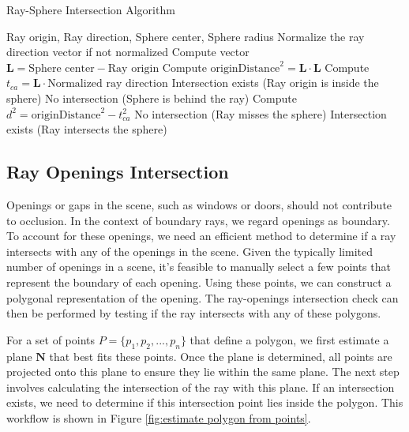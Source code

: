 \documentclass[11pt, a4paper,oneside,chapterprefix=false]{scrbook}
\begin{document}
\begin{algorithm}[H]
\caption{Ray-Sphere Intersection Algorithm}
\begin{algorithmic}[1]
\Require Ray origin, Ray direction, Sphere center, Sphere radius
\State Normalize the ray direction vector if not normalized
\State Compute vector \( \mathbf{L} = \text{Sphere center} - \text{Ray origin} \)
\State Compute \( \text{originDistance}^2 = \mathbf{L} \cdot \mathbf{L} \)
\State Compute \( t_{ca} = \mathbf{L} \cdot \text{Normalized ray direction} \)
    \State \Return Intersection exists (Ray origin is inside the sphere)
\EndIf
{}
    \State \Return No intersection (Sphere is behind the ray)
\EndIf
\State Compute \( d^2 = \text{originDistance}^2 - t_{ca}^2 \)
    \State \Return No intersection (Ray misses the sphere)
\Else
    \State \Return Intersection exists (Ray intersects the sphere)
\EndIf
\end{algorithmic}
\end{algorithm}


\subsection{Ray Openings Intersection}

Openings or gaps in the scene, such as windows or doors, should not contribute to occlusion. In the context of boundary rays, we regard openings as boundary. To account for these openings, we need an efficient method to determine if a ray intersects with any of the openings in the scene. Given the typically limited number of openings in a scene, it's feasible to manually select a few points that represent the boundary of each opening. Using these points, we can construct a polygonal representation of the opening. The ray-openings intersection check can then be performed by testing if the ray intersects with any of these polygons.

\vspace{10pt}

For a set of points \( P = \{p_1, p_2, ..., p_n\} \) that define a polygon, we first estimate a plane \( \mathbf{N} \) that best fits these points. Once the plane is determined, all points are projected onto this plane to ensure they lie within the same plane. The next step involves calculating the intersection of the ray with this plane. If an intersection exists, we need to determine if this intersection point lies inside the polygon. This workflow is shown in Figure \ref{fig:estimate polygon from points}.
\end{document}
